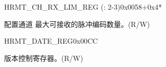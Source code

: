 \begin{register}{H}{RMT\_CH\_RX\_LIM\_REG (: 2-3)}{0x0058+0x4*}\label{regdesc:RMTCHMRXLIMREG}
%
%
\regnewline%
\begin{regdesc}\begin{reglist}
\label{fielddesc:RMTCHMRXLIMREG}\item [RMT\_CH\regindex{m}\_RX\_LIM\_REG] 配置通道  最大可接收的脉冲编码数量。(R/W)
\end{reglist}\end{regdesc}
\end{register}


\begin{register}{H}{RMT\_DATE\_REG}{0x00CC}\label{regdesc:RMTDATEREG}
%
%
\regnewline%
\begin{regdesc}\begin{reglist}
\label{fielddesc:RMTDATE}\item [RMT\_DATE] 版本控制寄存器。(R/W)
\end{reglist}\end{regdesc}
\end{register}
